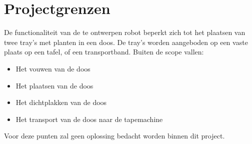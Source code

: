 
\section{Projectgrenzen}
De functionaliteit van de te ontwerpen robot beperkt zich tot het plaatsen van twee tray's met planten in een doos. De tray's worden aangeboden op een vaste plaats op een tafel, of een transportband. 
\newline
\newline
Buiten de scope vallen:
\begin{itemize}
    \item Het vouwen van de doos
    \item Het plaatsen van de doos
    \item Het dichtplakken van de doos
    \item Het transport van de doos naar de tapemachine
\end{itemize}
Voor deze punten zal geen oplossing bedacht worden binnen dit project.



